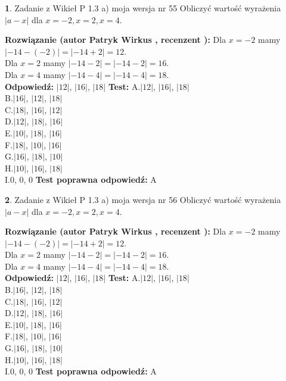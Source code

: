 \documentclass[12pt, a4paper]{article}
\theoremstyle{definition} %
\newtheorem{zad}{}
\newcommand{\zadStart}[1]{\begin{zad}#1\newline}
\newcommand{\zadStop}{\end{zad}}
\newcommand{\rozwStart}[2]{\noindent \textbf{Rozwiązanie (autor #1 , recenzent #2): }\newline}
\newcommand{\rozwStop}{\newline}
\newcommand{\odpStart}{\noindent \textbf{Odpowiedź:}\newline}
\newcommand{\odpStop}{\newline}
\newcommand{\testStart}{\noindent \textbf{Test:}\newline}
\newcommand{\testStop}{\newline}
\newcommand{\kluczStart}{\noindent \textbf{Test poprawna odpowiedź:}\newline}
\newcommand{\kluczStop}{\newline}
\begin{document}
\zadStart{Zadanie z Wikieł P 1.3 a) moja wersja nr 55}
Obliczyć wartość wyrażenia $|a - x|$ dla $x=-2,x=2,x=4$.
\zadStop
\rozwStart{Patryk Wirkus}{}
Dla $x = -2$ mamy $|-14 - (-2)| = |-14 + 2| = 12$.\\
Dla $x = 2$ mamy $|-14 - 2| = |-14 - 2| = 16$.\\
Dla $x = 4$ mamy $|-14 - 4| = |-14 - 4| = 18$.\\
\rozwStop
\odpStart
$|12|$, $|16|$, $|18|$
\odpStop
\testStart
A.$|12|$, $|16|$, $|18|$\\
B.$|16|$, $|12|$, $|18|$\\
C.$|18|$, $|16|$, $|12|$\\
D.$|12|$, $|18|$, $|16|$\\
E.$|10|$, $|18|$, $|16|$\\
F.$|18|$, $|10|$, $|16|$\\
G.$|16|$, $|18|$, $|10|$\\
H.$|10|$, $|16|$, $|18|$\\
I.$0$, $0$, $0$
\testStop
\kluczStart
A
\kluczStop



\zadStart{Zadanie z Wikieł P 1.3 a) moja wersja nr 56}
Obliczyć wartość wyrażenia $|a - x|$ dla $x=-2,x=2,x=4$.
\zadStop
\rozwStart{Patryk Wirkus}{}
Dla $x = -2$ mamy $|-14 - (-2)| = |-14 + 2| = 12$.\\
Dla $x = 2$ mamy $|-14 - 2| = |-14 - 2| = 16$.\\
Dla $x = 4$ mamy $|-14 - 4| = |-14 - 4| = 18$.\\
\rozwStop
\odpStart
$|12|$, $|16|$, $|18|$
\odpStop
\testStart
A.$|12|$, $|16|$, $|18|$\\
B.$|16|$, $|12|$, $|18|$\\
C.$|18|$, $|16|$, $|12|$\\
D.$|12|$, $|18|$, $|16|$\\
E.$|10|$, $|18|$, $|16|$\\
F.$|18|$, $|10|$, $|16|$\\
G.$|16|$, $|18|$, $|10|$\\
H.$|10|$, $|16|$, $|18|$\\
I.$0$, $0$, $0$
\testStop
\kluczStart
A
\kluczStop
\end{document}

